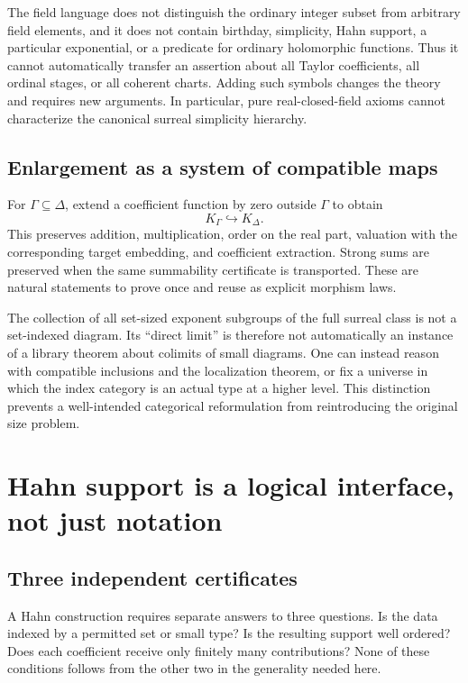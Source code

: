 \documentclass[11pt,letterpaper]{article}
\numberwithin{equation}{section}
\theoremstyle{definition}
\theoremstyle{remark}
\begin{document}
The field language does not distinguish the ordinary integer subset from arbitrary field elements, and it does not contain birthday, simplicity, Hahn support, a particular exponential, or a predicate for ordinary holomorphic functions. Thus it cannot automatically transfer an assertion about all Taylor coefficients, all ordinal stages, or all coherent charts. Adding such symbols changes the theory and requires new arguments. In particular, pure real-closed-field axioms cannot characterize the canonical surreal simplicity hierarchy.

\subsection{Enlargement as a system of compatible maps}
For $\Gamma\subseteq\Delta$, extend a coefficient function by zero outside $\Gamma$ to obtain
\[
K_\Gamma\hookrightarrow K_\Delta.
\]
This preserves addition, multiplication, order on the real part, valuation with the corresponding target embedding, and coefficient extraction. Strong sums are preserved when the same summability certificate is transported. These are natural statements to prove once and reuse as explicit morphism laws.

The collection of all set-sized exponent subgroups of the full surreal class is not a set-indexed diagram. Its ``direct limit'' is therefore not automatically an instance of a library theorem about colimits of small diagrams. One can instead reason with compatible inclusions and the localization theorem, or fix a universe in which the index category is an actual type at a higher level. This distinction prevents a well-intended categorical reformulation from reintroducing the original size problem.

\section{Hahn support is a logical interface, not just notation}\label{sec:support}

\subsection{Three independent certificates}
A Hahn construction requires separate answers to three questions. Is the data indexed by a permitted set or small type? Is the resulting support well ordered? Does each coefficient receive only finitely many contributions? None of these conditions follows from the other two in the generality needed here.
\end{document}
